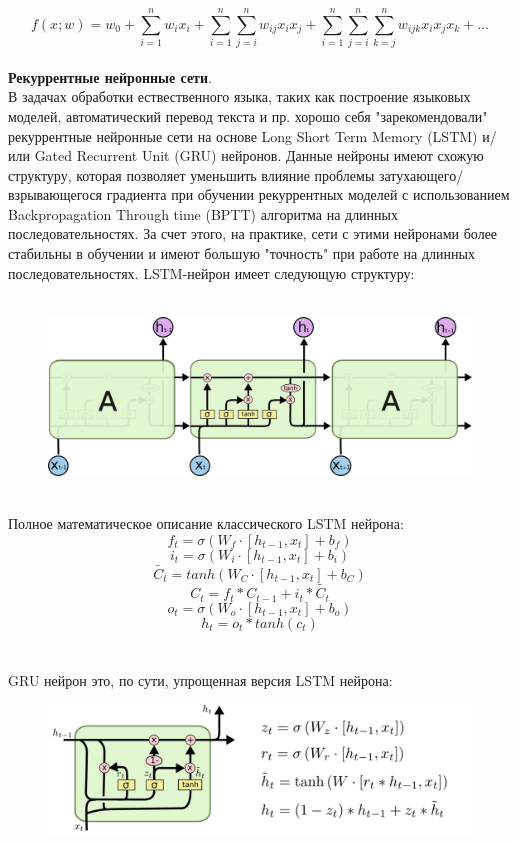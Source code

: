 \documentclass[11pt]{article}
\begin{document}
$$ f(x;w) = w_0 + \sum_{i=1}^{n}{w_ix_i} + \sum_{i=1}^{n}{\sum_{j=i}^{n}{w_{ij}x_ix_j}} + \sum_{i=1}^{n}{\sum_{j=i}^{n}{\sum_{k=j}^{n}{w_{ijk}x_ix_jx_k}}} + ... $$
\\
\textbf{Рекуррентные нейронные сети}.
\\
В задачах обработки ествественного языка, таких как построение языковых моделей, автоматический перевод текста и пр. хорошо себя "зарекомендовали" рекуррентные нейронные сети на основе Long Short Term Memory (LSTM) и/или Gated Recurrent Unit (GRU) нейронов. Данные нейроны имеют схожую структуру, которая позволяет уменьшить влияние проблемы затухающего/взрывающегося градиента при обучении рекуррентных моделей с использованием Backpropagation Through time (BPTT) алгоритма на длинных последовательностях. За счет этого, на практике, сети с этими нейронами более стабильны в обучении и имеют большую "точность" при работе на длинных последовательностях. LSTM-нейрон имеет следующую структуру:
\\
\\
\begin{figure}[h]
\centering
\includegraphics[scale=0.3]{LSTM3-chain.png}
\label{}
\end{figure}
\\
Полное математическое описание классического LSTM нейрона:
$$ f_t = \sigma( W_f \cdot [h_{t-1},x_t] + b_f) $$
$$ i_t = \sigma( W_i \cdot [h_{t-1},x_t] + b_i) $$
$$ \tilde{C_t} = tanh( W_C \cdot [h_{t-1},x_t] + b_C) $$
$$ C_t = f_t * C_{t-1} + i_t * \tilde{C_t} $$
$$ o_t = \sigma( W_o \cdot [h_{t-1},x_t] + b_o) $$
$$ h_t = o_t * tanh(c_t) $$
\\
\\
GRU нейрон это, по сути, упрощенная версия LSTM нейрона:
\begin{figure}[H]
\centering
\includegraphics[scale=0.50]{LSTM3-var-GRU.png}
\label{}
\end{figure}
\end{document}
